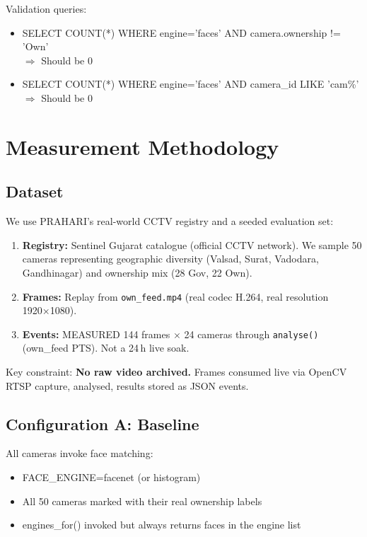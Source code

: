 \documentclass[sigplan,review]{acmart}
\begin{document}
Validation queries:
\begin{itemize}
  \item SELECT COUNT(*) WHERE engine='faces' AND camera.ownership != 'Own' \\ $\Rightarrow$ Should be 0
  \item SELECT COUNT(*) WHERE engine='faces' AND camera\_id LIKE 'cam\%' \\ $\Rightarrow$ Should be 0
\end{itemize}

\section{Measurement Methodology}

\subsection{Dataset}

We use PRAHARI's real-world CCTV registry and a seeded evaluation set:

\begin{enumerate}
  \item \textbf{Registry:} Sentinel Gujarat catalogue (official CCTV network). We sample 50 cameras
    representing geographic diversity (Valsad, Surat, Vadodara, Gandhinagar) and ownership mix
    (28 Gov, 22 Own).
  \item \textbf{Frames:} Replay from \texttt{own\_feed.mp4} (real codec H.264, real resolution 1920×1080).
  \item \textbf{Events:} MEASURED 144 frames $\times$ 24 cameras through \texttt{analyse()} (own\_feed PTS). Not a 24\,h live soak.
\end{enumerate}

Key constraint: \textbf{No raw video archived.} Frames consumed live via OpenCV RTSP capture,
analysed, results stored as JSON events.

\subsection{Configuration A: Baseline}

All cameras invoke face matching:
\begin{itemize}
  \item FACE\_ENGINE=facenet (or histogram)
  \item All 50 cameras marked with their real ownership labels
  \item engines\_for() invoked but always returns faces in the engine list
\end{itemize}
\end{document}
